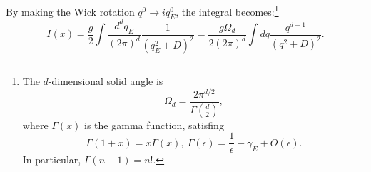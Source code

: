 By making the Wick rotation $q^0 \rightarrow i q_E^0$, the integral becomes:\footnote{
	The $d$-dimensional solid angle is
	\begin{equation}
		\Omega_d = \frac{2\pi^{d/2}}{\Gamma(\frac{d}{2})},
	\end{equation}
	where $\Gamma(x)$ is the gamma function, satisfing
	\begin{equation}
		\Gamma(1+x) = x\Gamma(x),\ 
		\Gamma(\epsilon) = \frac{1}{\epsilon}-\gamma_E + O(\epsilon).
	\end{equation}
	In particular, $\Gamma(n+1)=n!$.
}
\begin{equation*}
I(x) = \frac{g}{2}\int \frac{d^d q_E}{(2 \pi)^d} \frac{1}{\left(q_E^{2}+D\right)^{2}}
=\frac{g\Omega_d}{2(2\pi)^d} \int dq \frac{q^{d-1}}{\left(q^{2}+D\right)^{2}}.
\end{equation*}


